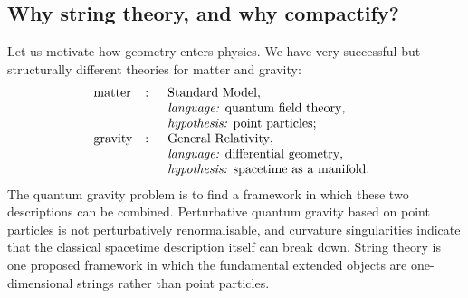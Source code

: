 \subsection{Why string theory, and why compactify?}



Let us motivate how geometry enters physics.
We have very successful but structurally different theories
for matter and gravity:
\begin{equation}
\begin{array}{lll}
\text{matter} &:&
  \begin{array}[t]{l}
    \text{Standard Model},\\
    \text{\emph{language:} quantum field theory},\\
    \text{\emph{hypothesis:} point particles};
  \end{array}
\\[1.2em]
\text{gravity} &:&
  \begin{array}[t]{l}
    \text{General Relativity},\\
    \text{\emph{language:} differential geometry},\\
    \text{\emph{hypothesis:} spacetime as a manifold}.
  \end{array}
\end{array}
\end{equation}
The quantum gravity problem is to find a framework in which these two
descriptions can be combined.  Perturbative quantum gravity based on
point particles is not perturbatively renormalisable, and curvature
singularities indicate that the classical spacetime description
itself can break down.  String theory is one proposed framework in
which the fundamental extended objects are one-dimensional strings
rather than point particles.

